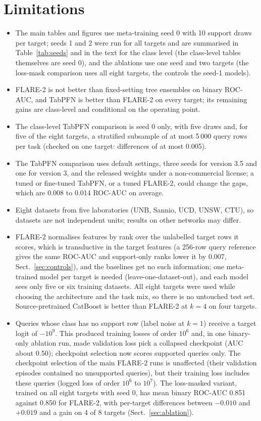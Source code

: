 \documentclass[11pt]{article}
\begin{document}
\section{Limitations}
\begin{itemize}
\item The main tables and figures use meta-training seed 0 with 10 support draws per target; seeds 1 and 2 were run for all targets and are summarised in Table~\ref{tab:seeds} and in the text for the class level (the class-level tables themselves are seed 0), and the ablations use one seed and two targets (the loss-mask comparison uses all eight targets, the controls the seed-1 models).
\item FLARE-2 is not better than fixed-setting tree ensembles on binary ROC-AUC, and TabPFN is better than FLARE-2 on every target; its remaining gains are class-level and conditional on the operating point.
\item The class-level TabPFN comparison is seed 0 only, with five draws and, for five of the eight targets, a stratified subsample of at most 5\,000 query rows per task (checked on one target: differences of at most 0.005).
\item The TabPFN comparison uses default settings, three seeds for version 3.5 and one for version 3, and the released weights under a non-commercial license; a tuned or fine-tuned TabPFN, or a tuned FLARE-2, could change the gaps, which are 0.008 to 0.014 ROC-AUC on average.
\item Eight datasets from five laboratories (UNB, Sannio, UCD, UNSW, CTU), so datasets are not independent units; results on other networks may differ.
\item FLARE-2 normalises features by rank over the unlabelled target rows it scores, which is transductive in the target features (a 256-row query reference gives the same ROC-AUC and support-only ranks lower it by 0.007, Sect.~\ref{sec:controls}), and the baselines get no such information; one meta-trained model per target is needed (leave-one-dataset-out), and each model sees only five or six training datasets. All eight targets were used while choosing the architecture and the task mix, so there is no untouched test set. Source-pretrained CatBoost is better than FLARE-2 at $k=4$ on four targets.
\item Queries whose class has no support row (label noise at $k=1$) receive a target logit of $-10^{9}$. This produced training losses of order $10^{6}$ and, in one binary-only ablation run, made validation loss pick a collapsed checkpoint (AUC about 0.50); checkpoint selection now scores supported queries only. The checkpoint selection of the main FLARE-2 runs is unaffected (their validation episodes contained no unsupported queries), but their training loss includes these queries (logged loss of order $10^{6}$ to $10^{7}$). The loss-masked variant, trained on all eight targets with seed 0, has mean binary ROC-AUC 0.851 against 0.850 for FLARE-2, with per-target differences between $-0.010$ and $+0.019$ and a gain on 4 of 8 targets (Sect.~\ref{sec:ablation}).

\end{itemize}
\end{document}
